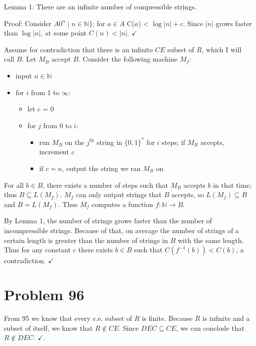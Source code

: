 \documentclass[11pt]{article}
\let\imp\rightarrow
\begin{document}
Lemma 1: There are an infinite number of compressible strings.

Proof: Consider $A 0^n \mid n \in \mathbb{N}\}$; for $a \in A$ C($a$) < $\log |n| +c$.
Since $|n|$ grows faster than $\log |n|$, at some point $C(n) < |n|$. $\checkmark$

Assume for contradiction that there is an infinite $CE$ subset of $R$, which I will call $B$.
Let $M_B$ accept $B$.
Consider the following machine $M_f$:
\begin{itemize}
	\item input $n \in \mathbb{N}$
	\item for $i$ from 1 to $\infty$:
	\begin{itemize}
		\item let $c$ = 0
		\item for $j$ from 0 to $i$:
		\begin{itemize}
			\item run $M_B$ on the $j^{\text{th}}$ string in $\{0,1\}^*$ for $i$ steps; if $M_B$ accepts, increment $c$
			\item if $c = n$, output the string we ran $M_B$ on
		\end{itemize}
	\end{itemize}
\end{itemize}

For all $b \in B$, there exists a number of steps such that $M_B$ accepts $b$ in that time; thus $B \subseteq L(M_f)$.
$M_f$ can only output strings that $B$ accepts, so $L(M_f) \subseteq B$ and $B = L(M_f)$.
Thus $M_f$ computes a function $f: \mathbb{N} \imp B$.

By Lemma 1, the number of strings grows faster than the number of incompressible strings.
Because of that, on average the number of strings of a certain length is greater than the number of strings in $B$ with the same length. Thus for any constant $c$ there exists $b \in B$ such that $C(f^{-1}(b)) < C(b)$, a contradiction. $\checkmark$





\section*{Problem 96}

From 95 we know that every c.e. subset of $R$ is finite.
Because $R$ is infinite and a subset of itself, we know that $R \notin CE$.
Since $DEC \subseteq CE$, we can conclude that $R \notin DEC$. $\checkmark$.
\end{document}
